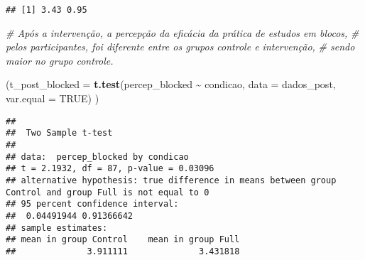 \documentclass[
]{article}
\newenvironment{Shaded}{\begin{snugshade}}{\end{snugshade}}
\newcommand{\AttributeTok}[1]{\textcolor[rgb]{0.13,0.29,0.53}{#1}}
\newcommand{\CommentTok}[1]{\textcolor[rgb]{0.56,0.35,0.01}{\textit{#1}}}
\newcommand{\ConstantTok}[1]{\textcolor[rgb]{0.56,0.35,0.01}{#1}}
\newcommand{\DecValTok}[1]{\textcolor[rgb]{0.00,0.00,0.81}{#1}}
\newcommand{\FunctionTok}[1]{\textcolor[rgb]{0.13,0.29,0.53}{\textbf{#1}}}
\newcommand{\NormalTok}[1]{#1}
\newcommand{\OtherTok}[1]{\textcolor[rgb]{0.56,0.35,0.01}{#1}}
\newcommand{\SpecialCharTok}[1]{\textcolor[rgb]{0.81,0.36,0.00}{\textbf{#1}}}
\newcommand{\StringTok}[1]{\textcolor[rgb]{0.31,0.60,0.02}{#1}}
\begin{document}
\begin{Shaded}
\end{Shaded}

\begin{verbatim}
## [1] 3.43 0.95
\end{verbatim}

\begin{Shaded}
\begin{Highlighting}[]
\CommentTok{\# Após a intervenção, a percepção da eficácia da prática de estudos em blocos,}
\CommentTok{\# pelos participantes, foi diferente entre os grupos controle e intervenção,}
\CommentTok{\# sendo maior no grupo controle.}

\NormalTok{(}\AttributeTok{t\_post\_blocked =} \FunctionTok{t.test}\NormalTok{(percep\_blocked }\SpecialCharTok{\textasciitilde{}}\NormalTok{ condicao,}
                         \AttributeTok{data =}\NormalTok{ dados\_post, }\AttributeTok{var.equal =} \ConstantTok{TRUE}\NormalTok{) )}
\end{Highlighting}
\end{Shaded}

\begin{verbatim}
## 
##  Two Sample t-test
## 
## data:  percep_blocked by condicao
## t = 2.1932, df = 87, p-value = 0.03096
## alternative hypothesis: true difference in means between group Control and group Full is not equal to 0
## 95 percent confidence interval:
##  0.04491944 0.91366642
## sample estimates:
## mean in group Control    mean in group Full 
##              3.911111              3.431818
\end{verbatim}
\end{document}
